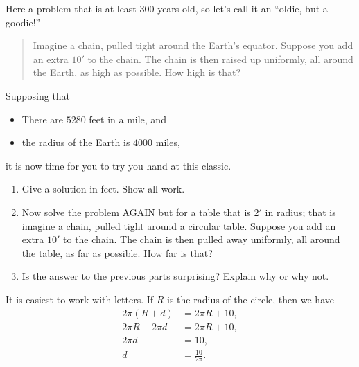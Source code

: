 \documentclass[noauthor,hints,nooutcomes,handout]{ximera}
\begin{document}
\begin{question} %
  Here a problem that is at least $300$ years old, so let's call it an  ``oldie, but a goodie!''
  \begin{quote}
    Imagine a chain, pulled tight around the Earth's equator. Suppose
    you add an extra $10'$ to the chain. The chain is then raised up
    uniformly, all around the Earth, as high as possible. How high is
    that?
  \end{quote}
  Supposing that
  \begin{itemize}
  \item There are $5280$ feet in a mile, and
  \item the radius of the Earth is $4000$ miles,
  \end{itemize}
  it is now time for you to try you hand at this classic.
  \begin{enumerate}
  \item Give a solution in feet. Show all work.
  \item Now solve the problem AGAIN but for a table that is $2'$ in
    radius; that is imagine a chain, pulled tight around a circular
    table. Suppose you add an extra $10'$ to the chain. The chain is
    then pulled away uniformly, all around the table, as far as
    possible. How far is that?
  \item Is the answer to the previous parts surprising? Explain why or
    why not.
  \end{enumerate}
  \begin{freeResponse}
    It is easiest to work with letters. If $R$ is the radius of the
    circle, then we have
    \begin{align*}
      2\pi (R + d) &= 2\pi R +10,\\
      2\pi R + 2\pi d &= 2\pi R + 10,\\
      2\pi d &= 10,\\
      d &= \frac{10}{2\pi}.
    \end{align*}
  \end{freeResponse}
\end{question}
\end{document}
